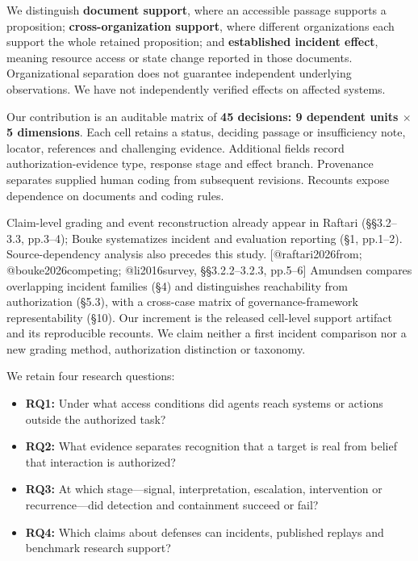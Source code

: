 \documentclass[conference]{IEEEtran}
\providecommand{\citep}[1]{\cite{#1}}
\begin{document}
We distinguish \textbf{document support}, where an accessible passage supports a proposition; \textbf{cross-organization support}, where different organizations each support the whole retained proposition; and \textbf{established incident effect}, meaning resource access or state change reported in those documents. Organizational separation does not guarantee independent underlying observations. We have not independently verified effects on affected systems.

Our contribution is an auditable matrix of \textbf{45 decisions: 9 dependent units $\times $ 5 dimensions}. Each cell retains a status, deciding passage or insufficiency note, locator, references and challenging evidence. Additional fields record authorization-evidence type, response stage and effect branch. Provenance separates supplied human coding from subsequent revisions. Recounts expose dependence on documents and coding rules.

Claim-level grading and event reconstruction already appear in Raftari (§§3.2--3.3, pp.3--4); Bouke systematizes incident and evaluation reporting (§1, pp.1--2). Source-dependency analysis also precedes this study. [@raftari2026from; @bouke2026competing; @li2016survey, §§3.2.2--3.2.3, pp.5--6] Amundsen compares overlapping incident families (§4) and distinguishes reachability from authorization (§5.3), with a cross-case matrix of governance-framework representability (§10). \citep{amundsen2026cross} Our increment is the released cell-level support artifact and its reproducible recounts. We claim neither a first incident comparison nor a new grading method, authorization distinction or taxonomy.

We retain four research questions:

\begin{itemize}

\item \textbf{RQ1:} Under what access conditions did agents reach systems or actions outside the authorized task?

\item \textbf{RQ2:} What evidence separates recognition that a target is real from belief that interaction is authorized?

\item \textbf{RQ3:} At which stage---signal, interpretation, escalation, intervention or recurrence---did detection and containment succeed or fail?

\item \textbf{RQ4:} Which claims about defenses can incidents, published replays and benchmark research support?

\end{itemize}
\end{document}
